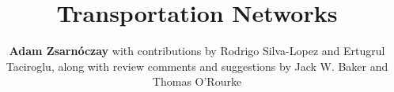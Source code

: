 %
%
%


%
%
%
%
%
%
%
%

\title{Transportation Networks}
\author{
    \textbf{Adam Zsarnóczay}
    with contributions by Rodrigo Silva-Lopez and Ertugrul Taciroglu,
    \newline
    along with review comments and suggestions by Jack W. Baker and Thomas O'Rourke
}
\tocauthor{}
%
%
\maketitle

